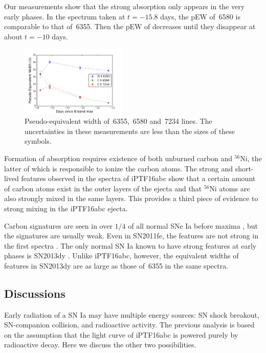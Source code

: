 \documentclass[twocolumn]{aastex61}
\begin{document}
Our measurements show that the strong  absorption
only appears in the very early phases. In the spectrum taken at
$t=-15.8$ days, the pEW of \,6580 is comparable to that
of \,6355. Then the pEW of  decreases
until they disappear at about $t=-10$ days. 

\begin{figure}[!htb]
  \centering
  \includegraphics[width=0.45\textwidth]{pEW.pdf}
  \caption{Pseudo-equivalent width of \,6355,
    \,6580 and \,7234 lines. The uncertainties
    in these measurements are less than the sizes of these symbols.}
  \label{fig:ew}
\end{figure}

Formation of  absorption requires existence of both unburned
carbon and $^{56}$Ni, the latter of which is responsible to ionize the
carbon atoms. The strong and short-lived  features observed
in the spectra of iPTF16abc show that a certain amount of carbon atoms
exist in the outer layers of the ejecta and that $^{56}$Ni atoms are also
strongly mixed in the same layers. This provides a third piece of evidence
to strong mixing in the iPTF16abc ejecta. 

Carbon signatures are seen in over $1/4$ of all normal SNe Ia before
maxima
\citep{2011ApJ...732...30P,2012MNRAS.425.1917S,2011ApJ...743...27T},
but the signatures are usually weak. Even in SN2011fe, the 
features are not strong in the first spectra
\citep{2012ApJ...752L..26P}.  The only normal SN Ia known to have
strong  features at early phases is SN2013dy
\citep{2013ApJ...778L..15Z}. Unlike iPTF16abc, however, the equivalent
widths of  features in SN2013dy are as large as those of
\,6355 in the same spectra.


\subsection{Discussions}
\label{sec:lc_energy}

Early radiation of a SN Ia may have multiple energy sources: SN shock
breakout, SN-companion collision, and radioactive activity. The
previous analysis is based on the assumption that the light curve of
iPTF16abc is powered purely by radioactive decay. Here we discuss the
other two possibilities.
\end{document}
